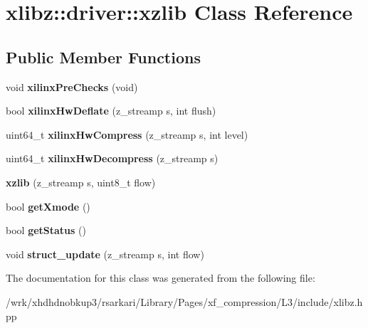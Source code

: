 \hypertarget{classxlibz_1_1driver_1_1xzlib}{\section{xlibz\-:\-:driver\-:\-:xzlib Class Reference}
\label{classxlibz_1_1driver_1_1xzlib}
}
\subsection*{Public Member Functions}
\begin{DoxyCompactItemize}
\item 
\hypertarget{classxlibz_1_1driver_1_1xzlib_ae9616e290db7dd8cf5e2ba57b1ee9402}{void {\bfseries xilinx\-Pre\-Checks} (void)}\label{classxlibz_1_1driver_1_1xzlib_ae9616e290db7dd8cf5e2ba57b1ee9402}

\item 
\hypertarget{classxlibz_1_1driver_1_1xzlib_aecbc8a0ee5a439263646bdc521ec06eb}{bool {\bfseries xilinx\-Hw\-Deflate} (z\-\_\-streamp s, int flush)}\label{classxlibz_1_1driver_1_1xzlib_aecbc8a0ee5a439263646bdc521ec06eb}

\item 
\hypertarget{classxlibz_1_1driver_1_1xzlib_a7275d9fbde57cba33ff8424cb5e58df9}{uint64\-\_\-t {\bfseries xilinx\-Hw\-Compress} (z\-\_\-streamp s, int level)}\label{classxlibz_1_1driver_1_1xzlib_a7275d9fbde57cba33ff8424cb5e58df9}

\item 
\hypertarget{classxlibz_1_1driver_1_1xzlib_afc7d0978f1546104818ac034ad909a52}{uint64\-\_\-t {\bfseries xilinx\-Hw\-Decompress} (z\-\_\-streamp s)}\label{classxlibz_1_1driver_1_1xzlib_afc7d0978f1546104818ac034ad909a52}

\item 
\hypertarget{classxlibz_1_1driver_1_1xzlib_a2a16b50de73aafbe037f04bdf530953a}{{\bfseries xzlib} (z\-\_\-streamp s, uint8\-\_\-t flow)}\label{classxlibz_1_1driver_1_1xzlib_a2a16b50de73aafbe037f04bdf530953a}

\item 
\hypertarget{classxlibz_1_1driver_1_1xzlib_aa0427d3fef585c4440e80fc2a6b3909c}{bool {\bfseries get\-Xmode} ()}\label{classxlibz_1_1driver_1_1xzlib_aa0427d3fef585c4440e80fc2a6b3909c}

\item 
\hypertarget{classxlibz_1_1driver_1_1xzlib_a6237f9a64f83854c6798f28e8cb641fe}{bool {\bfseries get\-Status} ()}\label{classxlibz_1_1driver_1_1xzlib_a6237f9a64f83854c6798f28e8cb641fe}

\item 
\hypertarget{classxlibz_1_1driver_1_1xzlib_a3e01c786083d0dd566a5e69ceadc433a}{void {\bfseries struct\-\_\-update} (z\-\_\-streamp s, int flow)}\label{classxlibz_1_1driver_1_1xzlib_a3e01c786083d0dd566a5e69ceadc433a}

\end{DoxyCompactItemize}


The documentation for this class was generated from the following file\-:\begin{DoxyCompactItemize}
\item 
/wrk/xhdhdnobkup3/rsarkari/\-Library/\-Pages/xf\-\_\-compression/\-L3/include/xlibz.\-hpp\end{DoxyCompactItemize}
